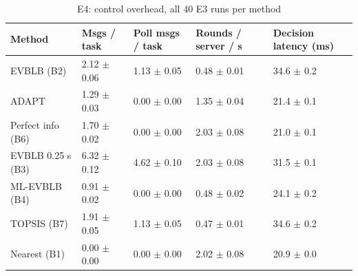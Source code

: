 \begin{table}[t]
\centering
\footnotesize
\caption{E4: control overhead, all 40 E3 runs per method}
\label{tab:e4}
\begin{tabular}{lllll}
\toprule
Method & Msgs / task & Poll msgs / task & Rounds / server / s & Decision latency (ms) \\
\midrule
EVBLB (B2) & 2.12 $\pm$ 0.06 & 1.13 $\pm$ 0.05 & 0.48 $\pm$ 0.01 & 34.6 $\pm$ 0.2 \\
ADAPT & 1.29 $\pm$ 0.03 & 0.00 $\pm$ 0.00 & 1.35 $\pm$ 0.04 & 21.4 $\pm$ 0.1 \\
Perfect info (B6) & 1.70 $\pm$ 0.02 & 0.00 $\pm$ 0.00 & 2.03 $\pm$ 0.08 & 21.0 $\pm$ 0.1 \\
EVBLB 0.25 s (B3) & 6.32 $\pm$ 0.12 & 4.62 $\pm$ 0.10 & 2.03 $\pm$ 0.08 & 31.5 $\pm$ 0.1 \\
ML-EVBLB (B4) & 0.91 $\pm$ 0.02 & 0.00 $\pm$ 0.00 & 0.48 $\pm$ 0.02 & 24.1 $\pm$ 0.2 \\
TOPSIS (B7) & 1.91 $\pm$ 0.05 & 1.13 $\pm$ 0.05 & 0.47 $\pm$ 0.01 & 34.6 $\pm$ 0.2 \\
Nearest (B1) & 0.00 $\pm$ 0.00 & 0.00 $\pm$ 0.00 & 2.02 $\pm$ 0.08 & 20.9 $\pm$ 0.0 \\
\bottomrule
\end{tabular}
\end{table}
